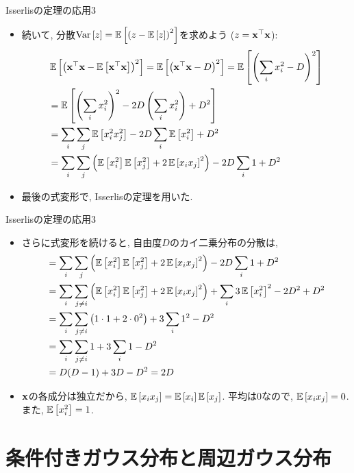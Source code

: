 \documentclass[dvipdfmx,notheorems,t]{beamer}
\begin{document}
\begin{frame}{Isserlisの定理の応用3}
\begin{itemize}
  \item 続いて, 分散$\Var{z} = \E{\left( z - \E{z} \right)^2}$を求めよう ($z = \vb{x}^\top \vb{x}$):
  \begin{align*}
    & \E{\left( \vb{x}^\top \vb{x} - \E{\vb{x}^\top \vb{x}} \right)^2}
    = \E{\left( \vb{x}^\top \vb{x} - D \right)^2}
    = \E{\left( \sum_i x_i^2 - D \right)^2} \\
    &= \E{\left( \sum_i x_i^2 \right)^2 - 2D \left( \sum_i x_i^2 \right) + D^2} \\
    &= \sum_i \sum_j \E{x_i^2 x_j^2} - 2D \sum_i \E{x_i^2} + D^2 \\
    &= \sum_i \sum_j \left( \E{x_i^2} \E{x_j^2} + 2 \E{x_i x_j}^2 \right)
      - 2D \sum_i 1 + D^2
  \end{align*}
  \item 最後の式変形で, Isserlisの定理を用いた.
\end{itemize}
\end{frame}

\begin{frame}{Isserlisの定理の応用3}
\begin{itemize}
  \item さらに式変形を続けると, 自由度$D$のカイ二乗分布の分散は,
  \begin{align*}
    &= \sum_i \sum_j \left( \E{x_i^2} \E{x_j^2} + 2 \E{x_i x_j}^2 \right)
      - 2D \sum_i 1 + D^2 \\
    &= \sum_i \sum_{j \neq i} \left( \E{x_i^2} \E{x_j^2} + 2 \E{x_i x_j}^2 \right)
      + \sum_i 3 \E{x_i^2}^2 - 2D^2 + D^2 \\
    &= \sum_i \sum_{j \neq i} \left( 1 \cdot 1 + 2 \cdot 0^2 \right) + 3 \sum_i 1^2 - D^2 \\
    &= \sum_i \sum_{j \neq i} 1 + 3 \sum_i 1 - D^2 \\
    &= D(D - 1) + 3D - D^2 = 2D
  \end{align*}
  \item $\vb{x}$の各成分は独立だから, $\E{x_i x_j} = \E{x_i} \E{x_j}$.
  平均は0なので, $\E{x_i x_j} = 0$.
  また, $\E{x_i^2} = 1$.
\end{itemize}
\end{frame}

\section{条件付きガウス分布と周辺ガウス分布}
\end{document}
